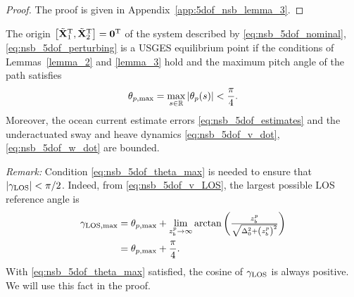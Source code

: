 \begin{proof}
    The proof is given in Appendix~\ref{app:5dof_nsb_lemma_3}.
\end{proof}

\begin{theorem}
    The origin $\left[\tilde{\mathbf{X}}_1^{\mathrm{T}}, \tilde{\mathbf{X}}_2^{\mathrm{T}}\right] = \mathbf{0}^{\mathrm{T}}$ of the system described by \eqref{eq:nsb_5dof_nominal},\eqref{eq:nsb_5dof_perturbing} is a USGES equilibrium point if the conditions of Lemmas~\ref{lemma_2} and \ref{lemma_3} hold and the maximum pitch angle of the path satisfies
    \begin{equation}
        \theta_{p, {\rm max}} = \max_{s \in \mathbb{R}} \left|\theta_p(s)\right| < \frac{\pi}{4}.
        \label{eq:nsb_5dof_theta_max}
    \end{equation}
    Moreover, the ocean current estimate errors \eqref{eq:nsb_5dof_estimates} and the underactuated sway and heave dynamics \eqref{eq:nsb_5dof_v_dot}, \eqref{eq:nsb_5dof_w_dot} are bounded.
\end{theorem}

\emph{Remark:} Condition \eqref{eq:nsb_5dof_theta_max} is needed to ensure that $\left|\gamma_{\rm LOS}\right| < \pi/2$.
Indeed, from \eqref{eq:nsb_5dof_v_LOS}, the largest possible LOS reference angle is
\begin{equation}
    \begin{split}
        \gamma_{\rm LOS, max} &= \theta_{p, {\rm max}} + \lim_{z_b^p \rightarrow \infty} \arctan\left(\scale[1]{\frac{z_b^p}{\sqrt{\Delta_0^2 + \left(z_b^p\right)^2}}}\right) \\
        &= \theta_{p, {\rm max}} + \frac{\pi}{4}.
    \end{split}
\end{equation}
With \eqref{eq:nsb_5dof_theta_max} satisfied, the cosine of $\gamma_{\rm LOS}$ is always positive. We will use this fact in the proof.

